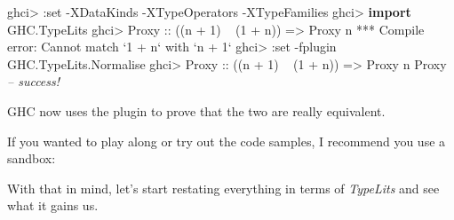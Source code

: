 \documentclass[]{article}
\newenvironment{Shaded}{}{}
\newcommand{\KeywordTok}[1]{\textcolor[rgb]{0.00,0.44,0.13}{\textbf{{#1}}}}
\newcommand{\DataTypeTok}[1]{\textcolor[rgb]{0.56,0.13,0.00}{{#1}}}
\newcommand{\DecValTok}[1]{\textcolor[rgb]{0.25,0.63,0.44}{{#1}}}
\newcommand{\CommentTok}[1]{\textcolor[rgb]{0.38,0.63,0.69}{\textit{{#1}}}}
\newcommand{\OtherTok}[1]{\textcolor[rgb]{0.00,0.44,0.13}{{#1}}}
\newcommand{\FunctionTok}[1]{\textcolor[rgb]{0.02,0.16,0.49}{{#1}}}
\newcommand{\NormalTok}[1]{{#1}}
\begin{document}
\begin{Shaded}
\begin{Highlighting}[]
\NormalTok{ghci}\FunctionTok{>} \FunctionTok{:}\NormalTok{set }\FunctionTok{-}\DataTypeTok{XDataKinds} \FunctionTok{-}\DataTypeTok{XTypeOperators} \FunctionTok{-}\DataTypeTok{XTypeFamilies}
\NormalTok{ghci}\FunctionTok{>} \KeywordTok{import }\DataTypeTok{GHC.TypeLits}
\NormalTok{ghci}\FunctionTok{>} \DataTypeTok{Proxy}\OtherTok{ ::} \NormalTok{((n }\FunctionTok{+} \DecValTok{1}\NormalTok{) }\FunctionTok{~} \NormalTok{(}\DecValTok{1} \FunctionTok{+} \NormalTok{n)) }\OtherTok{=>} \DataTypeTok{Proxy} \NormalTok{n}
\FunctionTok{***} \DataTypeTok{Compile} \NormalTok{error}\FunctionTok{:} \DataTypeTok{Cannot} \NormalTok{match }\OtherTok{`1 + n`} \NormalTok{with }\OtherTok{`n + 1`}
\NormalTok{ghci}\FunctionTok{>} \FunctionTok{:}\NormalTok{set }\FunctionTok{-}\NormalTok{fplugin }\DataTypeTok{GHC.TypeLits.Normalise}
\NormalTok{ghci}\FunctionTok{>} \DataTypeTok{Proxy}\OtherTok{ ::} \NormalTok{((n }\FunctionTok{+} \DecValTok{1}\NormalTok{) }\FunctionTok{~} \NormalTok{(}\DecValTok{1} \FunctionTok{+} \NormalTok{n)) }\OtherTok{=>} \DataTypeTok{Proxy} \NormalTok{n}
\DataTypeTok{Proxy}   \CommentTok{-- success!}
\end{Highlighting}
\end{Shaded}

GHC now uses the plugin to prove that the two are really equivalent.

If you wanted to play along or try out the code samples, I recommend you
use a sandbox:

\begin{Shaded}
\end{Shaded}

With that in mind, let's start restating everything in terms of
\emph{TypeLits} and see what it gains us.
\end{document}

